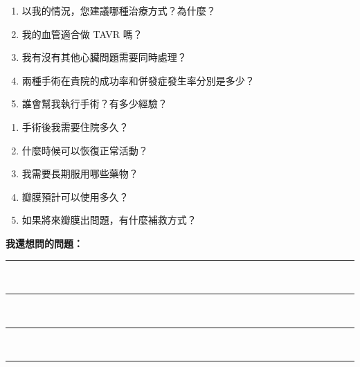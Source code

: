 \documentclass[12pt,a4paper]{article}
\begin{document}
\vspace{0.5cm}

\begin{checklistbox}[關於治療選擇]
\begin{enumerate}[leftmargin=*, itemsep=8pt]
    \item[$\square$] 以我的情況，您建議哪種治療方式？為什麼？
    \item[$\square$] 我的血管適合做 TAVR 嗎？
    \item[$\square$] 我有沒有其他心臟問題需要同時處理？
    \item[$\square$] 兩種手術在貴院的成功率和併發症發生率分別是多少？
    \item[$\square$] 誰會幫我執行手術？有多少經驗？
\end{enumerate}
\end{checklistbox}

\vspace{0.5cm}

\begin{checklistbox}[關於術後]
\begin{enumerate}[leftmargin=*, itemsep=8pt]
    \item[$\square$] 手術後我需要住院多久？
    \item[$\square$] 什麼時候可以恢復正常活動？
    \item[$\square$] 我需要長期服用哪些藥物？
    \item[$\square$] 瓣膜預計可以使用多久？
    \item[$\square$] 如果將來瓣膜出問題，有什麼補救方式？
\end{enumerate}
\end{checklistbox}

\vspace{0.5cm}

\begin{tcolorbox}[colback=light_purple, colframe=pda_purple, arc=8pt]
\begin{center}
{\large\bfseries\textcolor{pda_purple}{我還想問的問題：}}\\[0.5cm]
\end{center}
\rule{\textwidth}{0.5pt}\\[0.5cm]
\rule{\textwidth}{0.5pt}\\[0.5cm]
\rule{\textwidth}{0.5pt}\\[0.5cm]
\rule{\textwidth}{0.5pt}
\end{tcolorbox}

\newpage

\end{document}
